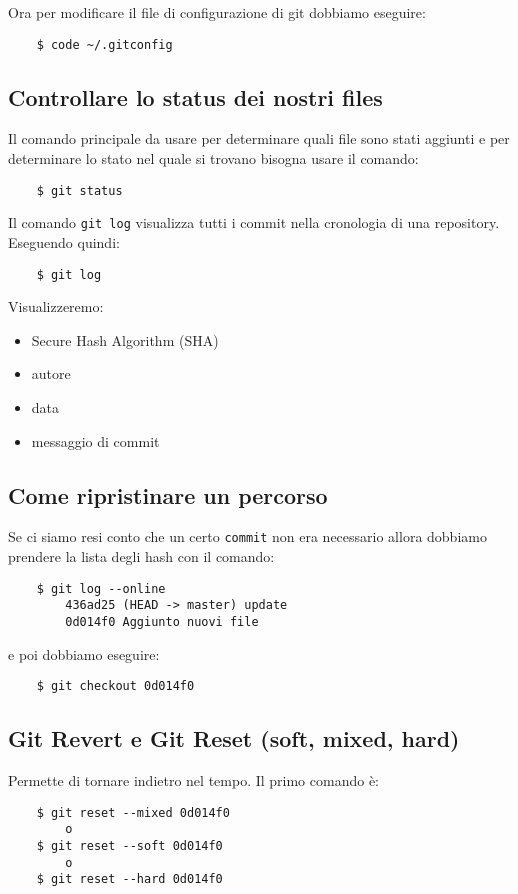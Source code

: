 \documentclass{article}
\begin{document}
Ora per modificare il file di configurazione di git dobbiamo eseguire:

\begin{verbatim}
    $ code ~/.gitconfig
\end{verbatim}


\subsection*{Controllare lo status dei nostri files}
Il comando principale da usare per determinare quali file sono stati aggiunti e per determinare lo stato nel quale si trovano bisogna usare il comando:
\begin{verbatim}
    $ git status
\end{verbatim}

Il comando \texttt{git log} visualizza tutti i commit nella cronologia di una repository. Eseguendo quindi:
\begin{verbatim}
    $ git log
\end{verbatim}
Visualizzeremo:
\begin{itemize}
    \item Secure Hash Algorithm (SHA)
    \item autore
    \item data
    \item messaggio di commit
\end{itemize}


\subsection*{Come ripristinare un percorso}
Se ci siamo resi conto che un certo \texttt{commit} non era necessario allora dobbiamo prendere la lista degli hash con il comando:
\begin{verbatim}
    $ git log --online
        436ad25 (HEAD -> master) update
        0d014f0 Aggiunto nuovi file
\end{verbatim}
e poi dobbiamo eseguire:
\begin{verbatim}
    $ git checkout 0d014f0
\end{verbatim}

\subsection*{Git Revert e Git Reset (soft, mixed, hard)}
Permette di tornare indietro nel tempo. Il primo comando è:
\begin{verbatim}
    $ git reset --mixed 0d014f0
        o
    $ git reset --soft 0d014f0
        o
    $ git reset --hard 0d014f0
     
\end{verbatim}
\end{document}
